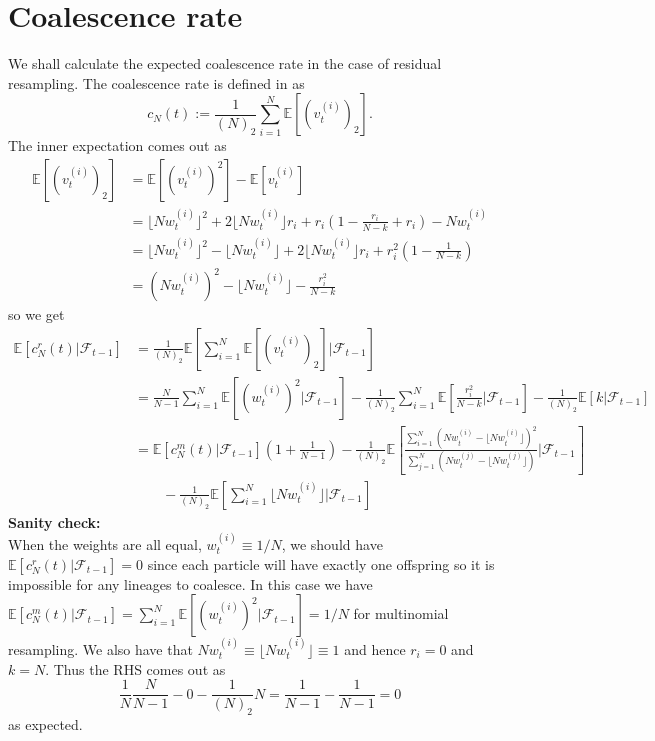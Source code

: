 \documentclass[fleqn]{article}
\newcommand{\E}{\mathbb{E}}
\newcommand{\F}{\mathcal{F}_{t-1}}
\newcommand{\vt}[2][t]{v_{#1}^{(#2)}}
\newcommand{\wt}[2][t]{w_{#1}^{(#2)}}
\begin{document}
\section{Coalescence rate}
We shall calculate the expected coalescence rate in the case of residual resampling. The coalescence rate is defined in \citet{koskela2018} as
\begin{equation*}
c_N(t) := \frac{1}{(N)_2} \sum_{i=1}^{N} \E\left[ (\vt{i})_2 \right].
\end{equation*}
The inner expectation comes out as
\begin{align*}
\E[(\vt{i})_2] &= \E[(\vt{i})^2] - \E[\vt{i}] \\
&= \lfloor N\wt{i} \rfloor^2 + 2\lfloor N\wt{i} \rfloor r_i + r_i \left(1 - \frac{r_i}{N-k} + r_i \right) - N\wt{i} \\
&= \lfloor N\wt{i} \rfloor^2 - \lfloor N\wt{i} \rfloor + 2\lfloor N\wt{i} \rfloor r_i + r_i^2 \left(1- \frac{1}{N-k} \right) \\
&= (N\wt{i})^2 - \lfloor N\wt{i} \rfloor - \frac{r_i^2}{N-k}
\end{align*}
so we get
\begin{align*}
\E[c^r_N(t) |\F] &=  \frac{1}{(N)_2} \E\left[ \sum_{i=1}^{N} \E[(\vt{i})_2] |\F \right] \\
&= \frac{N}{N-1} \sum_{i=1}^{N} \E[(\wt{i})^2 |\F] - \frac{1}{(N)_2} \sum_{i=1}^{N} \E\left[ \frac{r_i^2}{N-k} |\F \right] - \frac{1}{(N)_2} \E[k |\F] \\
&= \E[c^{m}_N(t) |\F] \left( 1 + \frac{1}{N-1} \right) - \frac{1}{(N)_2}  \E\left[ \frac{\sum_{i=1}^{N} (N\wt{i} - \lfloor N\wt{i}\rfloor)^2}{\sum_{j=1}^{N} (N\wt{j} - \lfloor N\wt{j}\rfloor)} |\F \right] \\
&\qquad -\frac{1}{(N)_2} \E \left[ \sum_{i=1}^{N} \lfloor N\wt{i}\rfloor |\F \right]
\end{align*}
\textbf{Sanity check:}\\
When the weights are all equal, $\wt{i} \equiv 1/N$, we should have $\E[c^r_N(t) |\F] = 0$ since each particle will have exactly one offspring so it is impossible for any lineages to coalesce. In this case we have $\E[c^{m}_N(t) |\F] = \sum_{i=1}^{N} \E[(\wt{i})^2 |\F] = 1/N$ for multinomial resampling. We also have that $N\wt{i} \equiv \lfloor N\wt{i} \rfloor \equiv 1$ and hence $r_i = 0$ and $k=N$. Thus the RHS comes out as
\begin{equation*}
\frac{1}{N}\frac{N}{N-1} - 0 - \frac{1}{(N)_2} N = \frac{1}{N-1} - \frac{1}{N-1} = 0
\end{equation*}
as expected.
\end{document}
